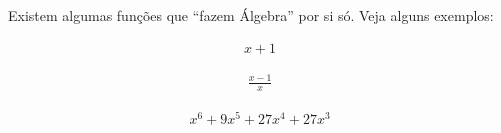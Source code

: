 \documentclass[letterpaper,10pt,english]{jupyterBook}
\begin{document}
\sphinxAtStartPar
Existem algumas funções que “fazem Álgebra” por si só. Veja alguns exemplos:

\begin{sphinxVerbatim}[commandchars=\\\{\}]
   
\end{sphinxVerbatim}
\begin{equation*}
\begin{split}\displaystyle x + 1\end{split}
\end{equation*}
\begin{sphinxVerbatim}[commandchars=\\\{\}]
\end{sphinxVerbatim}
\begin{equation*}
\begin{split}\displaystyle \frac{x - 1}{x}\end{split}
\end{equation*}
\begin{sphinxVerbatim}[commandchars=\\\{\}]
  
\end{sphinxVerbatim}
\begin{equation*}
\begin{split}\displaystyle x^{6} + 9 x^{5} + 27 x^{4} + 27 x^{3}\end{split}
\end{equation*}
\begin{sphinxVerbatim}[commandchars=\\\{\}]
            
\end{sphinxVerbatim}
\end{document}
